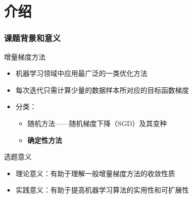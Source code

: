 \section{介绍}
\miniframesoff

\frame
{
\frametitle{课题背景和意义}
\begin{block}{增量梯度方法}
  \begin{itemize}
    \item 机器学习领域中应用最广泛的一类优化方法
    \item 每次迭代只需计算少量的数据样本所对应的目标函数梯度
    \item 分类：
      \begin{itemize}
        \item 随机方法——随机梯度下降（SGD）及其变种
        \item \textbf{确定性方法}
      \end{itemize}
  \end{itemize}
\end{block}

\pause

\begin{block}{选题意义}
  \begin{itemize}
    \item 理论意义：有助于理解一般增量梯度方法的收敛性质
    \item 实践意义：有助于提高机器学习算法的实用性和可扩展性
  \end{itemize}
\end{block}
}

